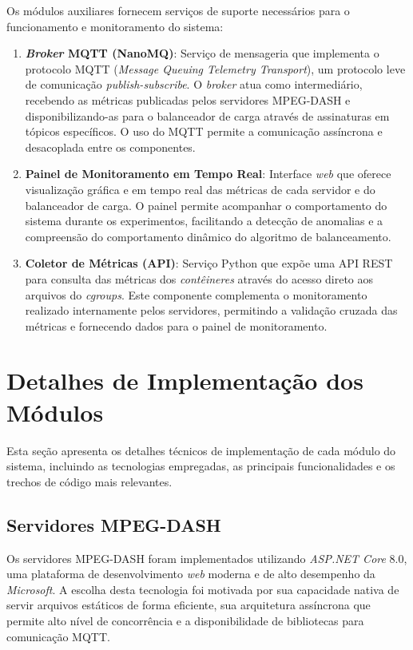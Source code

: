 Os módulos auxiliares fornecem serviços de suporte necessários para o funcionamento e monitoramento do sistema:

\begin{enumerate}
    \item \textbf{\textit{Broker} MQTT (NanoMQ)}: Serviço de mensageria que implementa o protocolo MQTT (\textit{Message Queuing Telemetry Transport}), um protocolo leve de comunicação \textit{publish-subscribe}. O \textit{broker} atua como intermediário, recebendo as métricas publicadas pelos servidores MPEG-DASH e disponibilizando-as para o balanceador de carga através de assinaturas em tópicos específicos. O uso do MQTT permite a comunicação assíncrona e desacoplada entre os componentes.
    
    \item \textbf{Painel de Monitoramento em Tempo Real}: Interface \textit{web} que oferece visualização gráfica e em tempo real das métricas de cada servidor e do balanceador de carga. O painel permite acompanhar o comportamento do sistema durante os experimentos, facilitando a detecção de anomalias e a compreensão do comportamento dinâmico do algoritmo de balanceamento.
    
    \item \textbf{Coletor de Métricas (API)}: Serviço Python que expõe uma API REST para consulta das métricas dos \textit{contêineres} através do acesso direto aos arquivos do \textit{cgroups}. Este componente complementa o monitoramento realizado internamente pelos servidores, permitindo a validação cruzada das métricas e fornecendo dados para o painel de monitoramento.
\end{enumerate}

\section{Detalhes de Implementação dos Módulos}

Esta seção apresenta os detalhes técnicos de implementação de cada módulo do sistema, incluindo as tecnologias empregadas, as principais funcionalidades e os trechos de código mais relevantes.

\subsection{Servidores MPEG-DASH}

Os servidores MPEG-DASH foram implementados utilizando \textit{ASP.NET Core} 8.0, uma plataforma de desenvolvimento \textit{web} moderna e de alto desempenho da \textit{Microsoft}. A escolha desta tecnologia foi motivada por sua capacidade nativa de servir arquivos estáticos de forma eficiente, sua arquitetura assíncrona que permite alto nível de concorrência e a disponibilidade de bibliotecas para comunicação MQTT.

